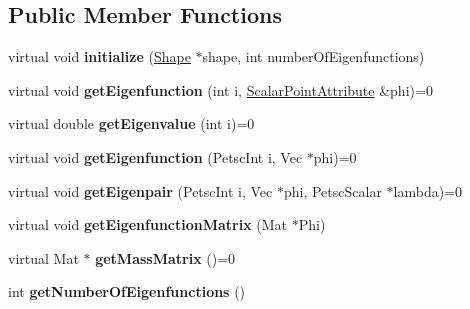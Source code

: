 \subsection*{Public Member Functions}
\begin{DoxyCompactItemize}
\item 
\hypertarget{class_laplace_beltrami_operator_a423822b9f1a6ac094b3f187e71936aa5}{}virtual void {\bfseries initialize} (\hyperlink{class_shape}{Shape} $\ast$shape, int number\+Of\+Eigenfunctions)\label{class_laplace_beltrami_operator_a423822b9f1a6ac094b3f187e71936aa5}

\item 
\hypertarget{class_laplace_beltrami_operator_a1f761e084fe593f6ef15ea4387939ccf}{}virtual void {\bfseries get\+Eigenfunction} (int i, \hyperlink{class_scalar_point_attribute}{Scalar\+Point\+Attribute} \&phi)=0\label{class_laplace_beltrami_operator_a1f761e084fe593f6ef15ea4387939ccf}

\item 
\hypertarget{class_laplace_beltrami_operator_a4574be5f06cdb575c3ae327140018df2}{}virtual double {\bfseries get\+Eigenvalue} (int i)=0\label{class_laplace_beltrami_operator_a4574be5f06cdb575c3ae327140018df2}

\item 
\hypertarget{class_laplace_beltrami_operator_aae4c110e717cc6324fec7bd32dd7fcc5}{}virtual void {\bfseries get\+Eigenfunction} (Petsc\+Int i, Vec $\ast$phi)=0\label{class_laplace_beltrami_operator_aae4c110e717cc6324fec7bd32dd7fcc5}

\item 
\hypertarget{class_laplace_beltrami_operator_a2b66fe8b96be6a53033886d8fc554732}{}virtual void {\bfseries get\+Eigenpair} (Petsc\+Int i, Vec $\ast$phi, Petsc\+Scalar $\ast$lambda)=0\label{class_laplace_beltrami_operator_a2b66fe8b96be6a53033886d8fc554732}

\item 
\hypertarget{class_laplace_beltrami_operator_a6edf61763fa043d3b1dcd0cf786ff04b}{}virtual void {\bfseries get\+Eigenfunction\+Matrix} (Mat $\ast$Phi)\label{class_laplace_beltrami_operator_a6edf61763fa043d3b1dcd0cf786ff04b}

\item 
\hypertarget{class_laplace_beltrami_operator_a49d8dda7af91604aa49641ac6c4d4e4e}{}virtual Mat $\ast$ {\bfseries get\+Mass\+Matrix} ()=0\label{class_laplace_beltrami_operator_a49d8dda7af91604aa49641ac6c4d4e4e}

\item 
\hypertarget{class_laplace_beltrami_operator_a338c9ffbc6343dfabbc76ac82da6e6b6}{}int {\bfseries get\+Number\+Of\+Eigenfunctions} ()\label{class_laplace_beltrami_operator_a338c9ffbc6343dfabbc76ac82da6e6b6}

\end{DoxyCompactItemize}
